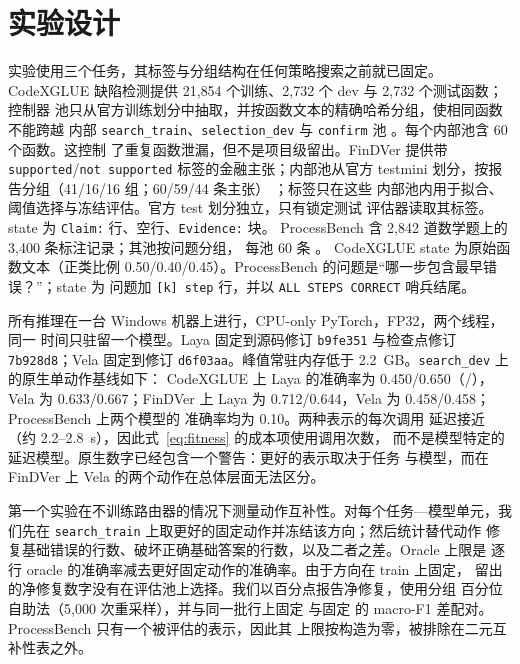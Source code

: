 \section{实验设计}

实验使用三个任务，其标签与分组结构在任何策略搜索之前就已固定。CodeXGLUE
缺陷检测提供 21{,}854 个训练、2{,}732 个 dev 与 2{,}732 个测试函数；控制器
池只从官方训练划分中抽取，并按函数文本的精确哈希分组，使相同函数不能跨越
内部 \texttt{search\_train}、\texttt{selection\_dev} 与 \texttt{confirm}
池 \citep{lu2021codexglue,zhou2019devign}。每个内部池含 60 个函数。这控制
了重复函数泄漏，但不是项目级留出。FinDVer 提供带
\texttt{supported}/\texttt{not supported} 标签的金融主张；内部池从官方
testmini 划分，按报告分组（41/16/16 组；60/59/44 条主张）
\citep{zhao2024findver}；标签只在这些
内部池内用于拟合、阈值选择与冻结评估。官方 test 划分独立，只有锁定测试
评估器读取其标签。state 为 \texttt{Claim:} 行、空行、\texttt{Evidence:} 块。
ProcessBench 含 2{,}842 道数学题上的 3{,}400 条标注记录；其池按问题分组，
每池 60 条 \citep{zheng2025processbench,cobbe2021gsm8k,lightman2024verify,uesato2022process}。
CodeXGLUE state 为原始函数文本（正类比例 0.50/0.40/0.45）。ProcessBench
的问题是“哪一步包含最早错误？”；state 为
问题加 \texttt{[k] step} 行，并以 \texttt{ALL STEPS CORRECT} 哨兵结尾。

所有推理在一台 Windows 机器上进行，CPU-only PyTorch，FP32，两个线程，同一
时间只驻留一个模型。Laya 固定到源码修订 \texttt{b9fe351} 与检查点修订
\texttt{7b928d8}；Vela 固定到修订 \texttt{d6f03aa}。峰值常驻内存低于
2.2~GB。\texttt{search\_dev} 上的原生单动作基线如下：
CodeXGLUE 上 Laya 的准确率为 0.450/0.650（\noul/\choice），Vela 为
0.633/0.667；FinDVer 上 Laya 为 0.712/0.644，Vela 为 0.458/0.458；
ProcessBench 上两个模型的 \choice{} 准确率均为 0.10。两种表示的每次调用
延迟接近（约 2.2--2.8~s），因此式~\ref{eq:fitness} 的成本项使用调用次数，
而不是模型特定的延迟模型。原生数字已经包含一个警告：更好的表示取决于任务
与模型，而在 FinDVer 上 Vela 的两个动作在总体层面无法区分。

第一个实验在不训练路由器的情况下测量动作互补性。对每个任务—模型单元，我们先在
\allowbreak\texttt{search\_train} 上取更好的固定动作并冻结该方向；然后统计替代动作
修复基础错误的行数、破坏正确基础答案的行数，以及二者之差。Oracle 上限是
逐行 oracle 的准确率减去更好固定动作的准确率。由于方向在 train 上固定，
留出的净修复数字没有在评估池上选择。我们以百分点报告净修复，使用分组
百分位自助法（5{,}000 次重采样），并与同一批行上固定 \choice{} 与固定
\noul{} 的 macro-F1 差配对。ProcessBench 只有一个被评估的表示，因此其
上限按构造为零，被排除在二元互补性表之外。

